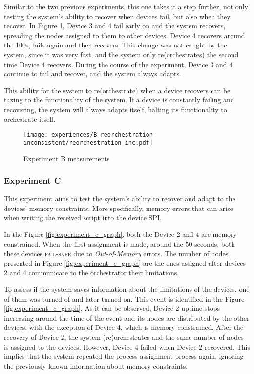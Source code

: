 Similar to the two previous experiments, this one takes it a step further, not only testing the system's ability to recover when devices fail, but also when they recover. In Figure \ref{fig:experiment_b_graph}, Device 3 and 4 fail early on and the system recovers, spreading the nodes assigned to them to other devices. Device 4 recovers around the 100s, fails again and then recovers. This change was not caught by the system, since it was very fast, and the system only re(orchestrates) the second time Device 4 recovers. During the course of the experiment, Device 3 and 4 continue to fail and recover, and the system always adapts.

This ability for the system to re(orchestrate) when a device recovers can be taxing to the functionality of the system. If a device is constantly failing and recovering, the system will always adapts itself, halting its functionality to orchestrate itself.

\begin{figure}[h]
\centering
\texttt{[image: experiences/B-reorchestration-inconsistent/reorchestration\_inc.pdf]}
\caption[Experiment B measurements]{Experiment B measurements}\label{fig:experiment_b_graph}
\end{figure}


\subsubsection{Experiment C}

This experiment aims to test the system's ability to recover and adapt to the devices' memory constraints. More specifically, memory errors that can arise when writing the received script into the device SPI.

In the Figure \ref{fig:experiment_c_graph}, both the Device 2 and 4 are memory constrained. When the first assignment is made, around the 50 seconds, both these devices \textsc{fail-safe} due to \textit{Out-of-Memory} errors. The number of nodes presented in Figure \ref{fig:experiment_c_graph} are the ones assigned after devices 2 and 4 communicate to the orchestrator their limitations. 

To assess if the system saves information about the limitations of the devices, one of them was turned of and later turned on. This event is identified in the Figure \ref{fig:experiment_c_graph}. As it can be observed, Device 2 uptime stops increasing around the time of the event and its nodes are distributed by the other devices, with the exception of Device 4, which is memory constrained. 
After the recovery of Device 2, the system (re)orchestrates and the same number of nodes is assigned to the devices. However, Device 4 failed when Device 2 recovered. This implies that the system repeated the process assignment process again, ignoring the previously known information about memory constraints.

